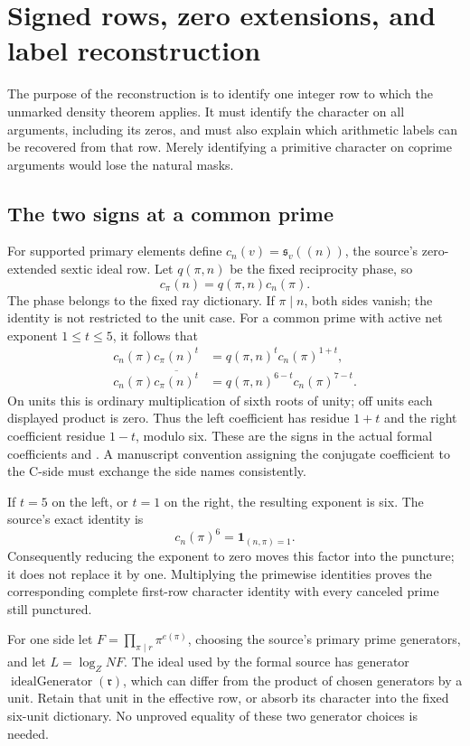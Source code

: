 \section{Signed rows, zero extensions, and label reconstruction}
\label{sec:signed-reconstruction}

The purpose of the reconstruction is to identify one integer row to which
the unmarked density theorem applies. It must identify the character on
all arguments, including its zeros, and must also explain which arithmetic
labels can be recovered from that row. Merely identifying a primitive
character on coprime arguments would lose the natural masks.

\subsection{The two signs at a common prime}
For supported primary elements define
$c_n(v)=\mathfrak s_v((n))$, the source's zero-extended sextic ideal row.
Let $q(\pi,n)$ be the fixed reciprocity phase, so
\[
 c_\pi(n)=q(\pi,n)c_n(\pi).
\]
The phase belongs to the fixed ray dictionary. If $\pi\mid n$, both
sides vanish; the identity is not restricted to the unit case.
For a common prime with active net exponent $1\le t\le5$, it follows that
\begin{align*}
 c_n(\pi)c_\pi(n)^t
   &=q(\pi,n)^t c_n(\pi)^{1+t},\\
 c_n(\pi)\overline{c_\pi(n)^t}
   &=q(\pi,n)^{6-t}c_n(\pi)^{7-t}.
\end{align*}
On units this is ordinary multiplication of sixth roots of unity;
off units each displayed product is zero. Thus the left coefficient has
residue $1+t$ and the right coefficient residue $1-t$, modulo six.
These are the signs in the actual formal coefficients
 and .
A manuscript convention assigning the conjugate coefficient to the
C-side must exchange the side names consistently.

If $t=5$ on the left, or $t=1$ on the right, the resulting exponent is six.
The source's exact identity is
\[
 c_n(\pi)^6=\mathbf1_{(n,\pi)=1}.
\]
Consequently reducing the exponent to zero moves this factor into the
puncture; it does not replace it by one. Multiplying the primewise
identities proves the corresponding complete first-row character
identity with every canceled prime still punctured.

For one side let $F=\prod_{\pi\mid r}\pi^{e(\pi)}$, choosing the
source's primary prime generators, and let $L=\log_Z NF$. The ideal
used by the formal source has generator
$\operatorname{idealGenerator}(\mathfrak r)$, which can differ from the
product of chosen generators by a unit. Retain that unit in the effective
row, or absorb its character into the fixed six-unit dictionary. No
unproved equality of these two generator choices is needed.

